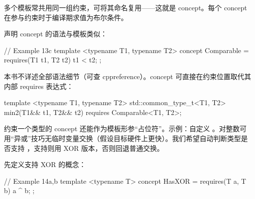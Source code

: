 多个模板常共用同一组约束，可将其命名复用——这就是 concept。每个 concept 在参与约束时于编译期求值为布尔条件。

声明 concept 的语法与模板类似：

\begin{code}
// Example 13c
template <typename T1, typename T2> concept Comparable =
  requires(T1 t1, T2 t2) { t1 < t2; };
\end{code}

本书不详述全部语法细节（可查 cppreference）。concept 可直接在约束位置取代其内部 requires 表达式：

\begin{code}
template <typename T1, typename T2>
std::common_type_t<T1, T2> min2(T1&& t1, T2&& t2)
  requires Comparable<T1, T2>;
\end{code}

约束一个类型的 concept 还能作为模板形参“占位符”。示例：自定义 。对整数可用“异或”技巧无临时变量交换（假设目标硬件上更快）。我们希望自动判断类型是否支持 \cii{^}，支持则用 XOR 版本，否则回退普通交换。

先定义支持 XOR 的概念：

\begin{code}
// Example 14a,b
template <typename T> concept HasXOR =
  requires(T a, T b) { a ^ b; };
\end{code}

